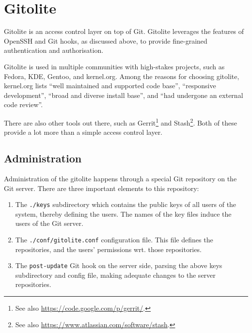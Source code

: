 
\section{Gitolite}

Gitolite is an access control layer on top of Git\cite{gitolite-com-2014a}.
Gitolite leverages the features of OpenSSH and Git hooks, as discussed above,
to provide fine-grained authentication and
authorisation\cite{gitolite-com-2014b}.

Gitolite is used in multiple communities with high-stakes projects, such as
Fedora, KDE, Gentoo, and kernel.org\cite{gitolite-com-2014c}. Among the reasons
for choosing gitolite, kernel.org lists\cite{kernel-org-2014} ``well maintained
and supported code base'', ``responsive development'', ``broad and diverse
install base'', and ``had undergone an external code
review''\cite{gitolite-google-group-2011}.

There are also other tools out there, such as  Gerrit\footnote{See also
\url{https://code.google.com/p/gerrit/}.} and Stash\footnote{See also
\url{https://www.atlassian.com/software/stash}.}. Both of these provide a lot
more than a simple access control layer.

\subsection{Administration}

Administration of the gitolite happens through a special Git repository on the
Git server. There are three important elements to this repository:

\begin{enumerate}

\item The \texttt{./keys} subdirectory which contains the public keys of all
users of the system, thereby defining the users. The names of the key files
induce the users of the Git server\cite{gitolite-com-2014d}.

\item The \texttt{./conf/gitolite.conf} configuration file. This file defines
the repositories, and the users' permissions wrt. those repositories.

\item The \texttt{post-update} Git hook on the server side, parsing the above
keys subdirectory and config file, making adequate changes to the server
repositories.

\end{enumerate}

